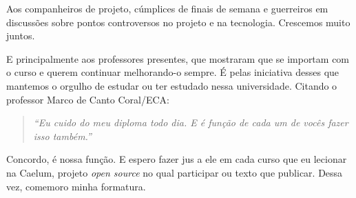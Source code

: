 \documentclass[titlepage,a4paper]{article}
\newcommand{\opensource}{\textit{open source}}
\begin{document}
Aos companheiros de projeto, cúmplices de finais de semana e guerreiros em discussões sobre pontos controversos no projeto e na tecnologia. Crescemos muito juntos.

E principalmente aos professores presentes, que mostraram que se importam com o curso e querem continuar melhorando-o sempre. É pelas iniciativa desses que mantemos o orgulho de estudar ou ter estudado nessa universidade. Citando o professor Marco de Canto Coral/ECA:

\begin{quote}
	\textit{``Eu cuido do meu diploma todo dia. E é função de cada um de vocês fazer isso também.''}
\end{quote}

Concordo, é nossa função. E espero fazer jus a ele em cada curso que eu lecionar na Caelum, projeto \opensource{} no qual participar ou texto que publicar. Dessa vez, comemoro minha formatura.
\end{document}
